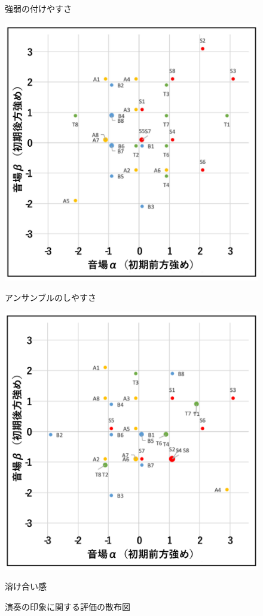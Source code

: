 \documentclass[11pt,a4j]{jreport}
\begin{document}
\begin{figure}[H]
\begin{minipage}{0.5\linewidth}
    \caption*{強弱の付けやすさ}
  \end{minipage}
  \begin{minipage}{.5\linewidth}
    \centering
    \includegraphics[width=.9\linewidth]{images/subjectiveExp/scat_early_10ensemble.pdf}
    \caption*{アンサンブルのしやすさ}
  \end{minipage}%
  \begin{minipage}{.5\linewidth}
    \centering
    \includegraphics[width=.9\linewidth]{images/subjectiveExp/scat_early_11notConflict.pdf}
    \caption*{溶け合い感}
  \end{minipage}

  \caption{演奏の印象に関する評価の散布図}
  \label{fig:演奏の印象に関する評価の散布図}
\end{figure}
\end{document}
